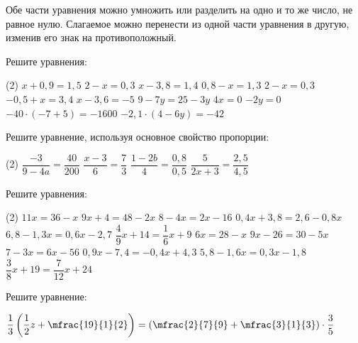 %
%

\begin{class}[number=1]
	\begin{definit}
		Обе части уравнения можно умножить или разделить на одно и то же число, не равное нулю. Слагаемое можно перенести из одной части уравнения в другую, изменив его знак на противоположный.
	\end{definit}
	\begin{listofex}
		\item Решите уравнения: %
		\begin{tasks}(2)
			\task \( x+0,9=1,5 \)
			\task \( 2-x=0,3 \)
			\task \( x-3,8=1,4 \)
			\task \( 0,8-x=1,3 \)
			\task \( 2-x=0,3 \)
			\task \( -0,5+x=3,4 \)
			\task \( x-3,6=-5 \)
			\task \( 9-7y=25-3y \)
			\task \( 4x=0 \)
			\task \( -2y=0 \)
			\task \( -40 \cdot (-7+5)=-1600 \)
			\task \( -2,1 \cdot (4-6y)=-42 \)
		\end{tasks}
		\item Решите уравнение, используя основное свойство пропорции:
		\begin{tasks}(2)
			\task \( \dfrac{-3}{9-4a} = \dfrac{40}{200} \)
			\task \( \dfrac{x-3}{6} = \dfrac{7}{3} \)
			\task \( \dfrac{1-2b}{4} = \dfrac{0,8}{0,5} \)
			\task \( \dfrac{5}{2x+3} = \dfrac{2,5}{4,5} \)
		\end{tasks}
		\item Решите уравнения: %
		\begin{tasks}(2)
			\task \( 11x=36-x \)
			\task \( 9x+4=48-2x \)
			\task \( 8-4x=2x-16 \)
			\task \( 0,4x+3,8=2,6-0,8x \)
			\task \( 6,8-1,3x=0,6x-2,7 \)
			\task \( \dfrac{4}{9}x+14=\dfrac{1}{6}x+9 \)
			\task \( 6x=28-x \)
			\task \( 9x-26=30-5x \)
			\task \( 7-3x=6x-56 \)
			\task \( 0,9x-7,4=-0,4x+4,3 \)
			\task \( 5,8-1,6x=0,3x-1,8 \)
			\task \( \dfrac{3}{8}x+19=\dfrac{7}{12}x+24 \)
		\end{tasks}
		\item Решите уравнение: %
		\begin{tasks}
			\task \( \dfrac{1}{3} \left( \dfrac{1}{2}z+\mfrac{19}{1}{2} \right) = \left(  \mfrac{2}{7}{9}+\mfrac{3}{1}{3} \right) \cdot \dfrac{3}{5} \)
		\end{tasks}
	\end{listofex}
\end{class}

